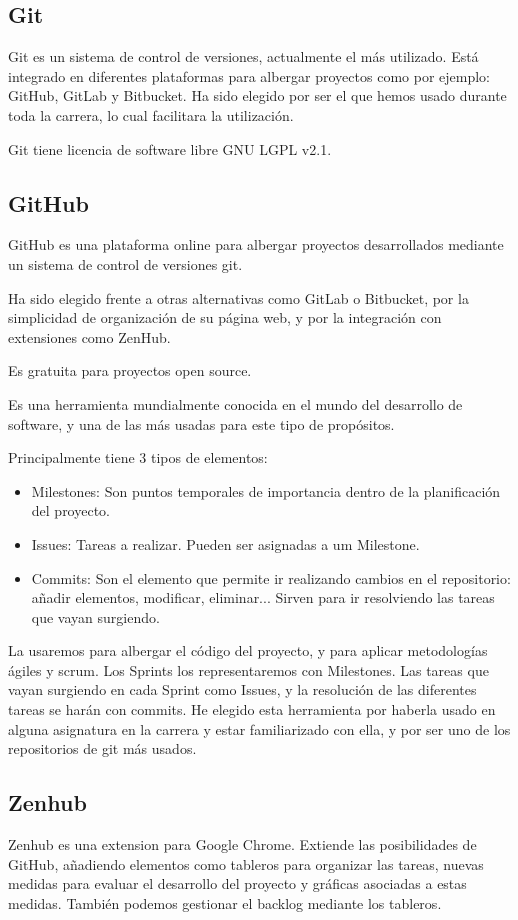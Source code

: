 \subsection{Git}
Git es un sistema de control de versiones, actualmente el más utilizado. Está integrado en diferentes plataformas para albergar proyectos como por ejemplo: GitHub, GitLab y Bitbucket.
Ha sido elegido por ser el que hemos usado durante toda la carrera, lo cual facilitara la utilización.

Git tiene licencia de software libre GNU LGPL v2.1.

\subsection{GitHub}
GitHub es una plataforma online para albergar proyectos desarrollados mediante un sistema de control de versiones git. 

Ha sido elegido frente a otras alternativas como GitLab o Bitbucket, por la simplicidad de organización de su página web, y por la integración con extensiones como ZenHub.

Es gratuita para proyectos open source.

Es una herramienta mundialmente conocida en el mundo del desarrollo de software, y una de las más usadas para este tipo de propósitos.

Principalmente tiene 3 tipos de elementos:
\begin{itemize}
	\item Milestones: Son puntos temporales de importancia dentro de la planificación del proyecto.
	\item Issues: Tareas a realizar. Pueden ser asignadas a um Milestone. 
 	\item Commits: Son el elemento que permite ir realizando cambios en el repositorio: añadir elementos, modificar, eliminar... Sirven para ir resolviendo las tareas que vayan surgiendo.
\end{itemize}

La usaremos para albergar el código del proyecto, y para aplicar metodologías ágiles y scrum. Los Sprints los representaremos con Milestones. Las tareas que vayan surgiendo en cada Sprint como Issues, y la resolución de las diferentes tareas se harán con commits. He elegido esta herramienta por haberla usado en alguna asignatura en la carrera y estar familiarizado con ella, y por ser uno de los repositorios de git más usados.

\subsection{Zenhub}
Zenhub es una extension para Google Chrome. Extiende las posibilidades de GitHub, añadiendo elementos como tableros para organizar las tareas, nuevas medidas para evaluar el desarrollo del proyecto y gráficas asociadas a estas medidas. También podemos gestionar el backlog mediante los tableros.


